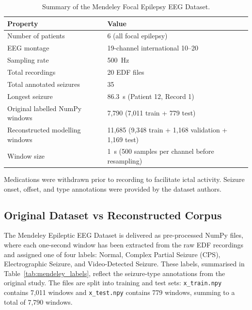 \documentclass[12pt, a4paper]{report}
\begin{document}
\begin{table}[H]
  \centering
  \caption{Summary of the Mendeley Focal Epilepsy EEG Dataset.}
  \label{tab:dataset}
  \begin{tabular}{ll}
    \toprule
    \textbf{Property}          & \textbf{Value} \\
    \midrule
    Number of patients         & 6 (all focal epilepsy) \\
    EEG montage                & 19-channel international 10--20 \\
    Sampling rate              & 500~Hz \\
    Total recordings           & 20 EDF files \\
    Total annotated seizures   & 35 \\
    Longest seizure            & 86.3~s (Patient 12, Record 1) \\
    Original labelled NumPy windows & 7{,}790 (7{,}011 train + 779 test) \\
    Reconstructed modelling windows & 11{,}685 (9{,}348 train + 1{,}168 validation + 1{,}169 test) \\
    Window size                & 1~s (500 samples per channel before resampling) \\
    \bottomrule
  \end{tabular}
\end{table}

Medications were withdrawn prior to recording to facilitate ictal activity.
Seizure onset, offset, and type annotations were provided by the dataset
authors.

\subsection{Original Dataset vs Reconstructed Corpus}
\label{sec:original_vs_reconstructed}

The Mendeley Epileptic EEG Dataset is delivered as pre-processed NumPy
files, where each one-second window has been extracted from the raw EDF
recordings and assigned one of four labels: Normal, Complex Partial
Seizure (CPS), Electrographic Seizure, and Video-Detected Seizure. These
labels, summarised in Table~\ref{tab:mendeley_labels}, reflect the
seizure-type annotations from the original study. The files are split into
training and test sets: \texttt{x\_train.npy} contains 7{,}011 windows
and \texttt{x\_test.npy} contains 779 windows, summing to a total of
7{,}790 windows.
\end{document}
